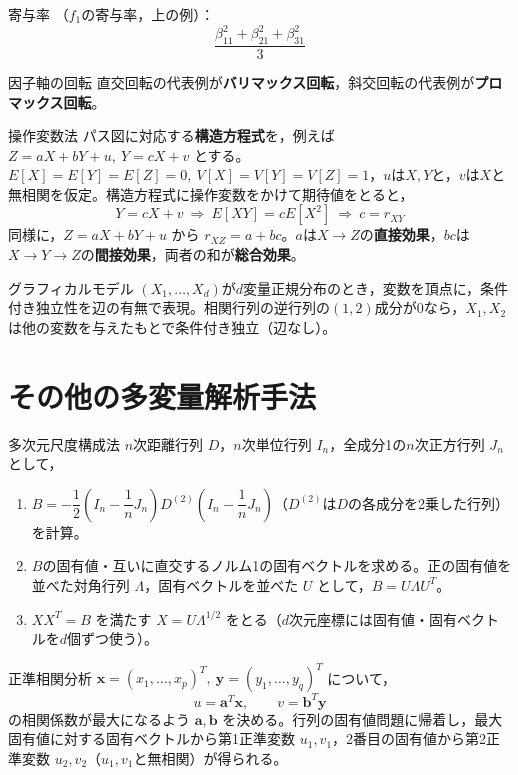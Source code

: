 \documentclass[a4paper,11pt]{ltjsarticle}
\begin{document}
\begin{term}{寄与率}
（$f_1$の寄与率，上の例）：
\[
\frac{\beta_{11}^2+\beta_{21}^2+\beta_{31}^2}{3}
\]
\end{term}

\begin{term}{因子軸の回転}
直交回転の代表例が\textbf{バリマックス回転}，斜交回転の代表例が\textbf{プロマックス回転}。
\end{term}

\begin{term}{操作変数法}
パス図に対応する\textbf{構造方程式}を，例えば $Z=aX+bY+u,\ Y=cX+v$ とする。$E[X]=E[Y]=E[Z]=0,\ V[X]=V[Y]=V[Z]=1$，$u$は$X,Y$と，$v$は$X$と無相関を仮定。構造方程式に操作変数をかけて期待値をとると，
\[
Y=cX+v \ \Rightarrow\ E[XY]=cE[X^2] \ \Rightarrow\ c = r_{XY}
\]
同様に，$Z=aX+bY+u$ から $r_{XZ}=a+bc$。$a$は$X\to Z$の\textbf{直接効果}，$bc$は$X\to Y\to Z$の\textbf{間接効果}，両者の和が\textbf{総合効果}。
\end{term}

\begin{term}{グラフィカルモデル}
$(X_1,\dots,X_d)$が$d$変量正規分布のとき，変数を頂点に，条件付き独立性を辺の有無で表現。相関行列の逆行列の$(1,2)$成分が0なら，$X_1,X_2$は他の変数を与えたもとで条件付き独立（辺なし）。
\end{term}

\section{その他の多変量解析手法}

\begin{term}{多次元尺度構成法}
$n$次距離行列 $D$，$n$次単位行列 $I_n$，全成分1の$n$次正方行列 $J_n$ として，
\begin{enumerate}[label=\arabic*.]
\item $B = -\dfrac12\left(I_n-\dfrac1n J_n\right)D^{(2)}\left(I_n-\dfrac1n J_n\right)$（$D^{(2)}$は$D$の各成分を2乗した行列）を計算。
\item $B$の固有値・互いに直交するノルム1の固有ベクトルを求める。正の固有値を並べた対角行列 $\Lambda$，固有ベクトルを並べた $U$ として，$B=U\Lambda U^T$。
\item $XX^T=B$ を満たす $X=U\Lambda^{1/2}$ をとる（$d$次元座標には固有値・固有ベクトルを$d$個ずつ使う）。
\end{enumerate}
\end{term}

\begin{term}{正準相関分析}
$\bm x=(x_1,\dots,x_p)^T,\ \bm y=(y_1,\dots,y_q)^T$ について，
\[
u = \bm a^T\bm x,\qquad v=\bm b^T\bm y
\]
の相関係数が最大になるよう $\bm a,\bm b$ を決める。行列の固有値問題に帰着し，最大固有値に対する固有ベクトルから第1正準変数 $u_1,v_1$，2番目の固有値から第2正準変数 $u_2,v_2$（$u_1,v_1$と無相関）が得られる。
\end{term}
\end{document}

